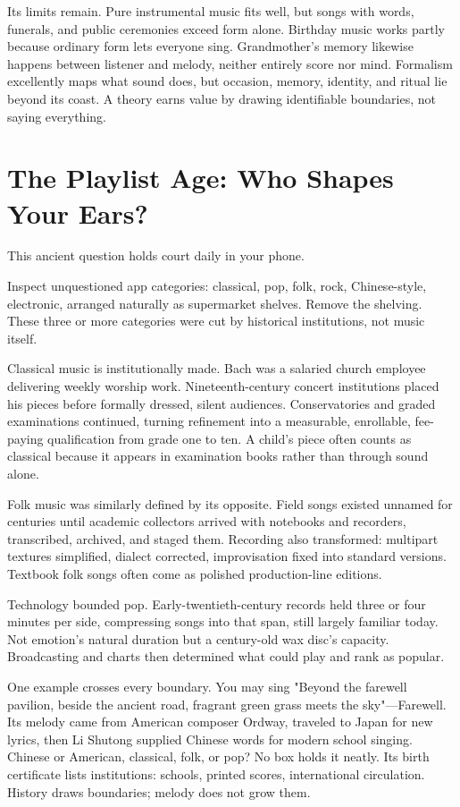 Its limits remain. Pure instrumental music fits well, but songs with words, funerals, and public ceremonies exceed form alone. Birthday music works partly because ordinary form lets everyone sing. Grandmother's memory likewise happens between listener and melody, neither entirely score nor mind. Formalism excellently maps what sound does, but occasion, memory, identity, and ritual lie beyond its coast. A theory earns value by drawing identifiable boundaries, not saying everything.

\section{The Playlist Age: Who Shapes Your Ears?}
This ancient question holds court daily in your phone.

Inspect unquestioned app categories: classical, pop, folk, rock, Chinese-style, electronic, arranged naturally as supermarket shelves. Remove the shelving. These three or more categories were cut by historical institutions, not music itself.

Classical music is institutionally made. Bach was a salaried church employee delivering weekly worship work. Nineteenth-century concert institutions placed his pieces before formally dressed, silent audiences. Conservatories and graded examinations continued, turning refinement into a measurable, enrollable, fee-paying qualification from grade one to ten. A child's piece often counts as classical because it appears in examination books rather than through sound alone.

Folk music was similarly defined by its opposite. Field songs existed unnamed for centuries until academic collectors arrived with notebooks and recorders, transcribed, archived, and staged them. Recording also transformed: multipart textures simplified, dialect corrected, improvisation fixed into standard versions. Textbook folk songs often come as polished production-line editions.

Technology bounded pop. Early-twentieth-century records held three or four minutes per side, compressing songs into that span, still largely familiar today. Not emotion's natural duration but a century-old wax disc's capacity. Broadcasting and charts then determined what could play and rank as popular.

One example crosses every boundary. You may sing "Beyond the farewell pavilion, beside the ancient road, fragrant green grass meets the sky"---Farewell. Its melody came from American composer Ordway, traveled to Japan for new lyrics, then Li Shutong supplied Chinese words for modern school singing. Chinese or American, classical, folk, or pop? No box holds it neatly. Its birth certificate lists institutions: schools, printed scores, international circulation. History draws boundaries; melody does not grow them.

